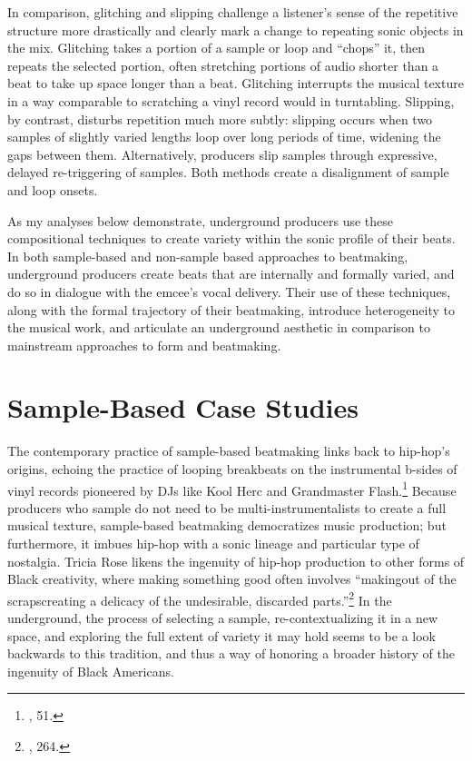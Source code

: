 In comparison, glitching and slipping challenge a listener's sense of the repetitive structure more drastically and clearly mark a change to repeating sonic objects in the mix. Glitching takes a portion of a sample or loop and ``chops'' it, then repeats the selected portion, often stretching portions of audio shorter than a beat to take up space longer than a beat. Glitching interrupts the musical texture in a way comparable to scratching a vinyl record would in turntabling. Slipping, by contrast, disturbs repetition much more subtly: slipping occurs when two samples of slightly varied lengths loop over long periods of time, widening the gaps between them. Alternatively, producers slip samples through expressive, delayed re-triggering of samples. Both methods create a disalignment of sample and loop onsets.

As my analyses below demonstrate, underground producers use these compositional techniques to create variety within the sonic profile of their beats. In both sample-based and non-sample based approaches to beatmaking, underground producers create beats that are internally and formally varied, and do so in dialogue with the emcee's vocal delivery. Their use of these techniques, along with the formal trajectory of their beatmaking, introduce heterogeneity to the musical work, and articulate an underground aesthetic in comparison to mainstream approaches to form and beatmaking.
\section{Sample-Based Case Studies}
The contemporary practice of sample-based beatmaking links back to hip-hop's origins, echoing the practice of looping breakbeats on the instrumental b-sides of vinyl records pioneered by DJs like Kool Herc and Grandmaster Flash.\footnote{\cite{triciaroseBlackNoiseRap1994}, 51.} Because producers who sample do not need to be multi-instrumentalists to create a full musical texture, sample-based beatmaking democratizes music production; but furthermore, it imbues hip-hop with a sonic lineage and particular type of nostalgia. Tricia Rose likens the ingenuity of hip-hop production to other forms of Black creativity, where making something good often involves ``making\textellipsis out of the scraps\textemdash creating a delicacy of the undesirable, discarded parts.''\footnote{\cite{triciaroseHipHopWarsWhat2008}, 264.} In the underground, the process of selecting a sample, re-contextualizing it in a new space, and exploring the full extent of variety it may hold seems to be a look backwards to this tradition, and thus a way of honoring a broader history of the ingenuity of Black Americans.

